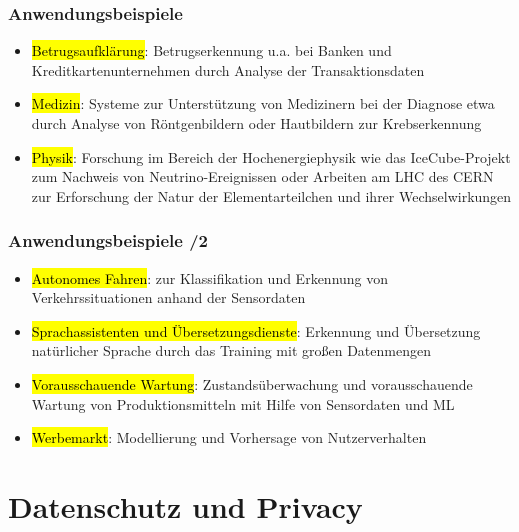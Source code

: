\begin{frame}
  \frametitle{Anwendungsbeispiele}

  \begin{itemize}
\item \hl{Betrugsaufklärung}: Betrugserkennung u.a. bei Banken und Kreditkartenunternehmen durch Analyse der Transaktionsdaten
\item \hl{Medizin}: Systeme zur Unterstützung von Medizinern bei der Diagnose etwa durch Analyse von Röntgenbildern oder Hautbildern zur Krebserkennung
\item \hl{Physik}: Forschung im Bereich der Hochenergiephysik wie das IceCube-Projekt zum Nachweis von Neutrino-Ereignissen oder Arbeiten am LHC des CERN zur Erforschung der Natur der Elementarteilchen und ihrer Wechselwirkungen

\end{itemize}
\end{frame}


\begin{frame}
  \frametitle{Anwendungsbeispiele /2}

  \begin{itemize}
    \item \hl{Autonomes Fahren}: zur Klassifikation und Erkennung von Verkehrssituationen anhand der Sensordaten
\item \hl{Sprachassistenten und Übersetzungsdienste}: Erkennung und Übersetzung natürlicher Sprache durch das Training mit großen Datenmengen
\item \hl{Vorausschauende Wartung}: Zustandsüberwachung und vorausschauende Wartung von Produktionsmitteln mit Hilfe von Sensordaten und ML
\item \hl{Werbemarkt}: Modellierung und Vorhersage von Nutzerverhalten

  \end{itemize}
  \end{frame}


\section{Datenschutz und Privacy}

